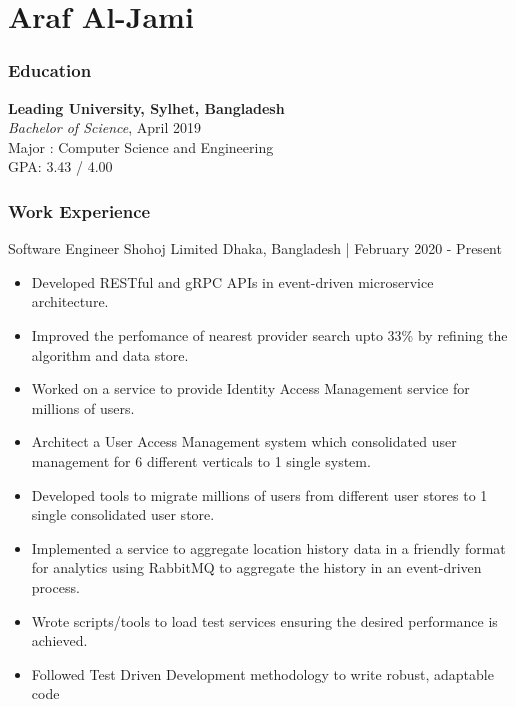 \documentclass{resumestyle}
\begin{document}
\large%

\part{Araf Al-Jami}

\section{Education}%

\textbf{Leading University, Sylhet, Bangladesh}\\%
\textit{Bachelor of Science}, April 2019\\%
Major : Computer Science and Engineering\\%
GPA: 3.43 / 4.00%

\section{Work Experience}%
    \worksubsection%
        {Software Engineer}%
        {Shohoj Limited}%
        {Dhaka, Bangladesh | February 2020 - Present}%
    
    \begin{itemize}[labelsep=4pt,leftmargin=*,topsep=5pt,partopsep=0pt,itemsep=1pt]%
        \item Developed RESTful and gRPC APIs in event-driven microservice architecture.%
        \item Improved the perfomance of nearest provider search upto 33\% by refining the algorithm and data store.
        \item Worked on a service to provide Identity Access Management service for millions of users.%
        \item Architect a User Access Management system which consolidated user management for 6 different verticals to 1 single system.%
        \item Developed tools to migrate millions of users from different user stores to 1 single consolidated user store.%
        \item Implemented a service to aggregate location history data in a friendly format for analytics using RabbitMQ to aggregate the history in an event-driven process.%
        \item Wrote scripts/tools to load test services ensuring the desired performance is achieved.%
        \item Followed Test Driven Development methodology to write robust, adaptable code%
    \end{itemize}%
\end{document}
